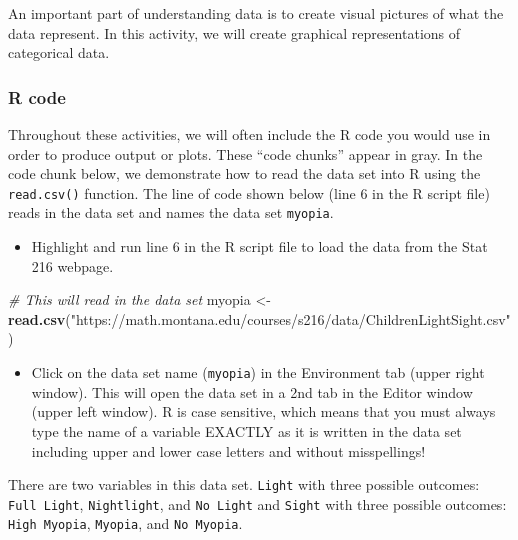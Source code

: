 \documentclass[
]{report}
\newenvironment{Shaded}{\begin{snugshade}}{\end{snugshade}}
\newcommand{\CommentTok}[1]{\textcolor[rgb]{0.56,0.35,0.01}{\textit{#1}}}
\newcommand{\FunctionTok}[1]{\textcolor[rgb]{0.13,0.29,0.53}{\textbf{#1}}}
\newcommand{\NormalTok}[1]{#1}
\newcommand{\OtherTok}[1]{\textcolor[rgb]{0.56,0.35,0.01}{#1}}
\newcommand{\StringTok}[1]{\textcolor[rgb]{0.31,0.60,0.02}{#1}}
\providecommand{\tightlist}{%
  \setlength{\itemsep}{0pt}\setlength{\parskip}{0pt}}
\begin{document}
An important part of understanding data is to create visual pictures of what the data represent. In this activity, we will create graphical representations of categorical data.

\hypertarget{r-code}{%
\subsubsection*{R code}\label{r-code}}

Throughout these activities, we will often include the R code you would use in order to produce output or plots. These ``code chunks'' appear in gray. In the code chunk below, we demonstrate how to read the data set into R using the \texttt{read.csv()} function. The line of code shown below (line 6 in the R script file) reads in the data set and names the data set \texttt{myopia}.

\begin{itemize}
\tightlist
\item
  Highlight and run line 6 in the R script file to load the data from the Stat 216 webpage.
\end{itemize}

\begin{Shaded}
\begin{Highlighting}[]
\CommentTok{\# This will read in the data set}
\NormalTok{myopia }\OtherTok{\textless{}{-}} \FunctionTok{read.csv}\NormalTok{(}\StringTok{"https://math.montana.edu/courses/s216/data/ChildrenLightSight.csv"}\NormalTok{) }
\end{Highlighting}
\end{Shaded}

\begin{itemize}
\tightlist
\item
  Click on the data set name (\texttt{myopia}) in the Environment tab (upper right window). This will open the data set in a 2nd tab in the Editor window (upper left window). R is case sensitive, which means that you must always type the name of a variable EXACTLY as it is written in the data set including upper and lower case letters and without misspellings!
\end{itemize}

There are two variables in this data set. \texttt{Light} with three possible outcomes: \texttt{Full\ Light}, \texttt{Nightlight}, and \texttt{No\ Light} and \texttt{Sight} with three possible outcomes: \texttt{High\ Myopia}, \texttt{Myopia}, and \texttt{No\ Myopia}.
\end{document}
